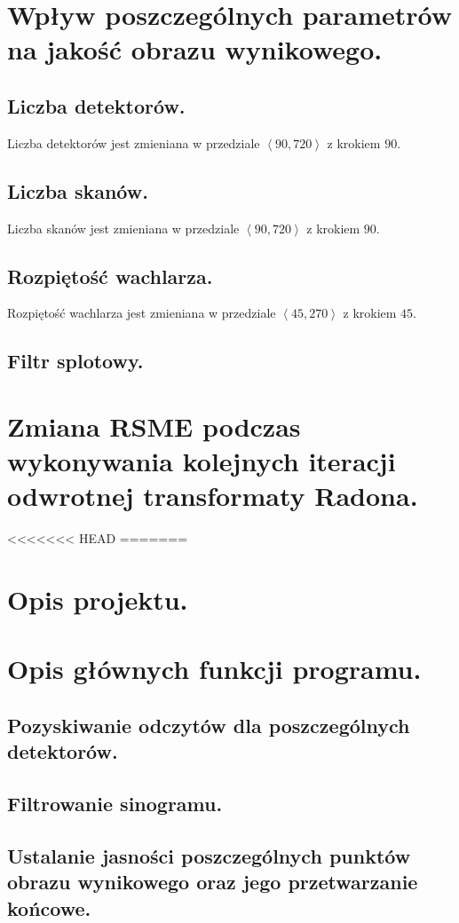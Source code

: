 \documentclass[a4paper, 11pt]{article}
\begin{document}
\section{Wpływ poszczególnych parametrów na jakość obrazu wynikowego.}
\subsection{Liczba detektorów.}

Liczba detektorów jest zmieniana w przedziale $\left<90, 720 \right>$ z krokiem $90$.
\subsection{Liczba skanów.}

Liczba skanów jest zmieniana w przedziale $\left<90, 720 \right>$ z krokiem $90$.
\subsection{Rozpiętość wachlarza.}

Rozpiętość wachlarza jest zmieniana w przedziale $\left<45, 270 \right>$ z krokiem $45$.
\subsection{Filtr splotowy.}

\section{Zmiana RSME podczas wykonywania kolejnych iteracji odwrotnej transformaty Radona.}

<<<<<<< HEAD
=======
	\section{Opis projektu.}
	\section{Opis głównych funkcji programu.}
	\subsection{Pozyskiwanie odczytów dla poszczególnych detektorów.}
	\subsection{Filtrowanie sinogramu.}
	\subsection{Ustalanie jasności poszczególnych punktów obrazu wynikowego oraz jego przetwarzanie końcowe.}
\end{document}
